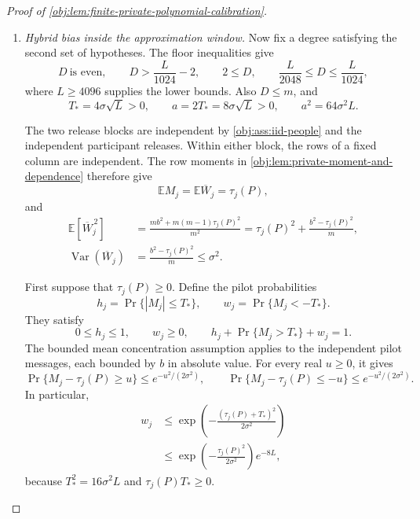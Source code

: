 \documentclass[11pt]{article}
\begin{document}
\begin{proof}[Proof of \cref{obj:lem:finite-private-polynomial-calibration}]
\begin{enumerate}
For the stipulated \(H=\log(e+\sigma^2L)\), we have
\[
H\ge1,
\qquad
DH\le\frac L{1024},
\qquad D\le L,
\qquad e^H=e+\sigma^2L.
\]
Since \(8\le e^3\), these inequalities imply
\[
1+8D\sigma^2
\le8(e+\sigma^2L)
=8e^H
\le e^{4H}.
\]
Thus
\[
e^{5D}(1+8D\sigma^2)^D
\le e^{5D+4DH}
\le e^{9DH},
\]
and hence
\[
\operatorname{Var}(\widehat p_{1/2,D,j})
\le\mathbb E[\widehat p_{1/2,D,j}^{\,2}]
\le\frac14e^{9DH}.
\]
Each polynomial estimate is a deterministic measurable statistic of its own column. Applying the average-variance conclusion of \cref{obj:lem:private-moment-and-dependence}, with \(0<m\le n\), proves
\[
\operatorname{Var}\left(\frac1d\sum_{j=1}^d\widehat p_{1/2,D,j}\right)
\le\frac2d\max_{j\in[d]}
       \operatorname{Var}(\widehat p_{1/2,D,j})
\le\frac{e^{9DH}}{2d}.
\]

\item \textit{Hybrid bias inside the approximation window.}
Now fix a degree satisfying the second set of hypotheses. The floor inequalities give
\[
D\ \text{is even},
\qquad
D>\frac L{1024}-2,
\qquad
2\le D,
\qquad
\frac L{2048}\le D\le\frac L{1024},
\]
where \(L\ge4096\) supplies the lower bounds. Also \(D\le m\), and
\[
T_*=4\sigma\sqrt L>0,
\qquad
a=2T_*=8\sigma\sqrt L>0,
\qquad
a^2=64\sigma^2L.
\]

The two release blocks are independent by \cref{obj:ass:iid-people} and the independent participant releases. Within either block, the rows of a fixed column are independent. The row moments in \cref{obj:lem:private-moment-and-dependence} therefore give
\[
\mathbb EM_j=\mathbb E\overline W_j=\tau_j(P),
\]
and
\[
\begin{aligned}
\mathbb E[\overline W_j^{\,2}]
&=\frac{mb^2+m(m-1)\tau_j(P)^2}{m^2}
=\tau_j(P)^2+\frac{b^2-\tau_j(P)^2}{m},\\
\operatorname{Var}(\overline W_j)
&=\frac{b^2-\tau_j(P)^2}{m}
\le\sigma^2.
\end{aligned}
\]

First suppose that \(\tau_j(P)\ge0\). Define the pilot probabilities
\[
h_j=\Pr\{|M_j|\le T_*\},
\qquad
w_j=\Pr\{M_j<-T_*\}.
\]
They satisfy
\[
0\le h_j\le1,
\qquad w_j\ge0,
\qquad
h_j+\Pr\{M_j>T_*\}+w_j=1.
\]
The bounded mean concentration assumption applies to the independent pilot messages, each bounded by \(b\) in absolute value. For every real \(u\ge0\), it gives
\[
\Pr\{M_j-\tau_j(P)\ge u\}
\le e^{-u^2/(2\sigma^2)},
\qquad
\Pr\{M_j-\tau_j(P)\le-u\}
\le e^{-u^2/(2\sigma^2)}.
\]
In particular,
\[
\begin{aligned}
w_j
&\le\exp\!\left(-\frac{(\tau_j(P)+T_*)^2}{2\sigma^2}\right)\\
&\le\exp\!\left(-\frac{\tau_j(P)^2}{2\sigma^2}\right)e^{-8L},
\end{aligned}
\]
because \(T_*^2=16\sigma^2L\) and \(\tau_j(P)T_*\ge0\).


\end{enumerate}
\end{proof}
\end{document}
